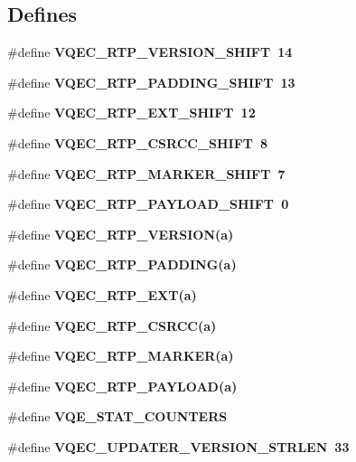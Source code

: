 \subsection*{Defines}
\begin{CompactItemize}
\item 
\#define \bf{VQEC\_\-RTP\_\-VERSION\_\-SHIFT}~14
\item 
\#define \bf{VQEC\_\-RTP\_\-PADDING\_\-SHIFT}~13
\item 
\#define \bf{VQEC\_\-RTP\_\-EXT\_\-SHIFT}~12
\item 
\#define \bf{VQEC\_\-RTP\_\-CSRCC\_\-SHIFT}~8
\item 
\#define \bf{VQEC\_\-RTP\_\-MARKER\_\-SHIFT}~7
\item 
\#define \bf{VQEC\_\-RTP\_\-PAYLOAD\_\-SHIFT}~0
\item 
\#define \bf{VQEC\_\-RTP\_\-VERSION}(a)
\item 
\#define \bf{VQEC\_\-RTP\_\-PADDING}(a)
\item 
\#define \bf{VQEC\_\-RTP\_\-EXT}(a)
\item 
\#define \bf{VQEC\_\-RTP\_\-CSRCC}(a)
\item 
\#define \bf{VQEC\_\-RTP\_\-MARKER}(a)
\item 
\#define \bf{VQEC\_\-RTP\_\-PAYLOAD}(a)
\item 
\#define \bf{VQE\_\-STAT\_\-COUNTERS}
\item 
\#define \bf{VQEC\_\-UPDATER\_\-VERSION\_\-STRLEN}~33
\end{CompactItemize}

